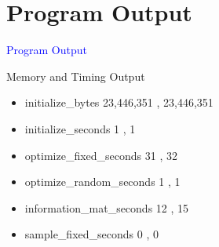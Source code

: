 \documentclass{beamer}
\newcommand{\Blue}[1]{\textcolor{blue}{#1}}
\newcommand{\Section}[1]{
	\section{#1}
	\begin{frame}
	\begin{center}
	\Blue{ \Large{#1} }
	\end{center}
	\end{frame}
}
\begin{document}
\Section{Program Output}
\begin{frame}{Memory and Timing Output}
\begin{itemize}

\item
initialize\_bytes
\hspace{4.6em} 23,446,351 , 23,446,351
\pause

\item
initialize\_seconds
\hspace{3.6em} 1 , 1
\pause

\item
optimize\_fixed\_seconds
\hspace{1.3em} 31 , 32
\pause

\item
optimize\_random\_seconds
\hspace{0.05em} 1 , 1
\pause

\item
information\_mat\_seconds
\hspace{0.25em} 12 , 15
\pause

\item
sample\_fixed\_seconds
\hspace{1.9em} 0 , 0
\pause

\end{itemize}
\end{frame}
\end{document}
